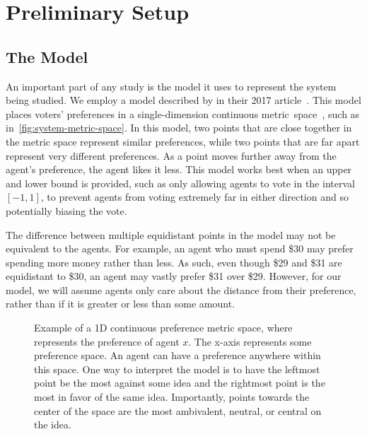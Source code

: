 \section{Preliminary Setup}\label{sec:preliminary-setup}

\subsection{The Model}\label{subsec:the-model}
An important part of any study is the model it uses to represent the system being
studied.
We employ a model described by  in their 2017
article~\cite{Cohensius2017}.
This model places voters' preferences in a single-dimension continuous
metric~space~\systemspace, such as in~\autoref{fig:system-metric-space}.
In this model, two points that are close together in the metric space represent
similar preferences, while two points that are far apart represent very different
preferences.
As a point moves further away from the agent's preference, the agent likes it less.
This model works best when an upper and lower bound is provided, such as only
allowing agents to vote in the interval $[-1, 1]$, to prevent agents from voting
extremely far in either direction and so potentially biasing the vote.

The difference between multiple equidistant points in the model may not be equivalent
to the agents.
For example, an agent who must spend \$30 may prefer spending more money rather than
less.
As such, even though \$29 and \$31 are equidistant to \$30, an agent may vastly
prefer \$31 over \$29.
However, for our model, we will assume agents only care about the distance from their
preference, rather than if it is greater or less than some amount.

\begin{figure}[htbp]
    \centering
    
    \caption{
        Example of a 1D continuous preference metric space, where  represents
        the preference of agent $x$.
        The x-axis represents some preference space.
        An agent can have a preference anywhere within this space.
        One way to interpret the model is to have the leftmost point be the most
        against some idea and the rightmost point is the most in favor of the same idea.
        Importantly, points towards the center of the space are the most ambivalent,
        neutral, or central on the idea.
    }
    \label{fig:system-metric-space}
\end{figure}

